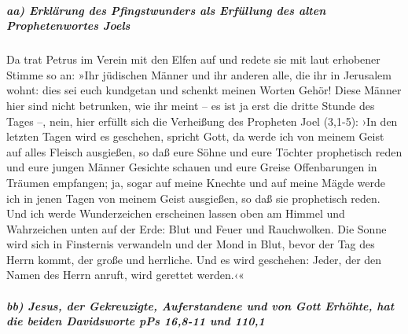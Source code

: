 \hypertarget{aa-erkluxe4rung-des-pfingstwunders-als-erfuxfcllung-des-alten-prophetenwortes-joels}{%
\subparagraph{aa) Erklärung des Pfingstwunders als Erfüllung des alten
Prophetenwortes
Joels}\label{aa-erkluxe4rung-des-pfingstwunders-als-erfuxfcllung-des-alten-prophetenwortes-joels}}

 Da trat Petrus im Verein mit den Elfen auf und redete
sie mit laut erhobener Stimme so an: »Ihr jüdischen Männer und ihr
anderen alle, die ihr in Jerusalem wohnt: dies sei euch kundgetan und
schenkt meinen Worten Gehör!  Diese Männer hier sind
nicht betrunken, wie ihr meint -- es ist ja erst die dritte Stunde des
Tages --,  nein, hier erfüllt sich die Verheißung des
Propheten Joel (3,1-5):  ›In den letzten Tagen wird es
geschehen, spricht Gott, da werde ich von meinem Geist auf alles Fleisch
ausgießen, so daß eure Söhne und eure Töchter prophetisch reden und eure
jungen Männer Gesichte schauen und eure Greise Offenbarungen in Träumen
empfangen;  ja, sogar auf meine Knechte und auf meine
Mägde werde ich in jenen Tagen von meinem Geist ausgießen, so daß sie
prophetisch reden.  Und ich werde Wunderzeichen
erscheinen lassen oben am Himmel und Wahrzeichen unten auf der Erde:
Blut und Feuer und Rauchwolken.  Die Sonne wird sich in
Finsternis verwandeln und der Mond in Blut, bevor der Tag des Herrn
kommt, der große und herrliche.  Und es wird geschehen:
Jeder, der den Namen des Herrn anruft, wird gerettet werden.‹«

\hypertarget{bb-jesus-der-gekreuzigte-auferstandene-und-von-gott-erhuxf6hte-hat-die-beiden-davidsworte-pps-168-11-und-1101}{%
\subparagraph{bb) Jesus, der Gekreuzigte, Auferstandene und von Gott
Erhöhte, hat die beiden Davidsworte \textbar pPs 16,8-11 und
110,1}\label{bb-jesus-der-gekreuzigte-auferstandene-und-von-gott-erhuxf6hte-hat-die-beiden-davidsworte-pps-168-11-und-1101}}

